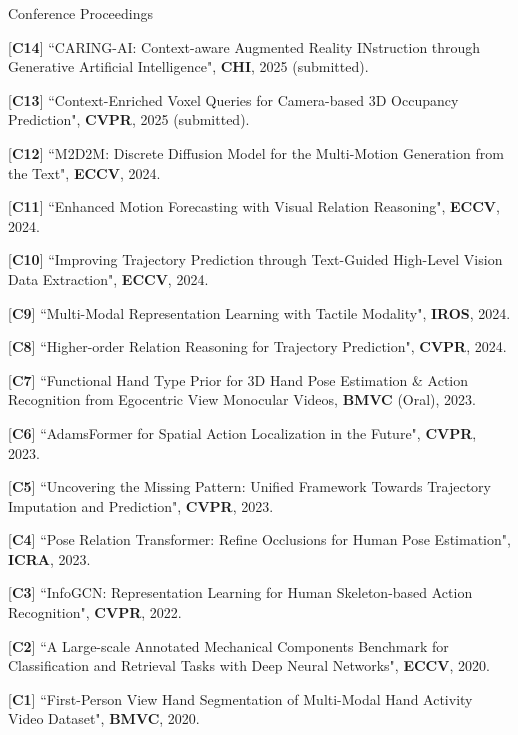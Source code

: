 


\begin{cventries}
\cvpub
{Conference Proceedings} %
{ %
\begin{cvitems}
    \item {[\textbf{C14}] ``CARING-AI: Context-aware Augmented Reality INstruction through Generative Artificial Intelligence", \textbf{CHI}, 2025 (submitted).}
    \item {[\textbf{C13}] ``Context-Enriched Voxel Queries for Camera-based 3D Occupancy Prediction", \textbf{CVPR}, 2025 (submitted).}
    \item {[\textbf{C12}] ``M2D2M: Discrete Diffusion Model for the Multi-Motion Generation from the Text", \textbf{ECCV}, 2024.}
    \item {[\textbf{C11}] ``Enhanced Motion Forecasting with Visual Relation Reasoning", \textbf{ECCV}, 2024.}
    \item {[\textbf{C10}] ``Improving Trajectory Prediction through Text-Guided High-Level Vision Data Extraction", \textbf{ECCV}, 2024.}
    \item {[\textbf{C9}] ``Multi-Modal Representation Learning with Tactile Modality", \textbf{IROS}, 2024.}
    \item {[\textbf{C8}] ``Higher-order Relation Reasoning for Trajectory Prediction", \textbf{CVPR}, 2024.}
    \item {[\textbf{C7}] ``Functional Hand Type Prior for 3D Hand Pose Estimation \& Action Recognition from Egocentric View Monocular Videos, \textbf{BMVC} (Oral), 2023.}
    \item {[\textbf{C6}] ``AdamsFormer for Spatial Action Localization in the Future", \textbf{CVPR}, 2023.}
    \item {[\textbf{C5}] ``Uncovering the Missing Pattern: Unified Framework Towards Trajectory Imputation and Prediction", \textbf{CVPR}, 2023.}
    \item {[\textbf{C4}] ``Pose Relation Transformer: Refine Occlusions for Human Pose Estimation", \textbf{ICRA}, 2023.}
    \item {[\textbf{C3}] ``InfoGCN: Representation Learning for Human Skeleton-based Action Recognition", \textbf{CVPR}, 2022.}
    \item {[\textbf{C2}] ``A Large-scale Annotated Mechanical Components Benchmark for Classification and Retrieval Tasks with Deep Neural Networks", \textbf{ECCV}, 2020.}
    \item {[\textbf{C1}] ``First-Person View Hand Segmentation of Multi-Modal Hand Activity Video Dataset", \textbf{BMVC}, 2020.}
\end{cvitems}
}



\end{cventries}
